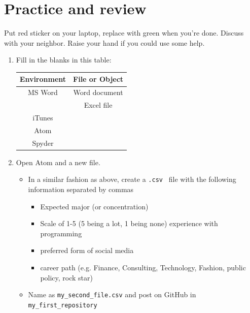 \section*{Practice and review}


Put red sticker on your laptop, replace with green when you're done.
Discuss with your neighbor.
Raise your hand if you could use some help.

\begin{enumerate}

\item Fill in the blanks in this table:

\begin{center}
\begin{tabular}{cc}
\toprule
Environment & File or Object \\
\midrule
MS Word  & Word document  \\
 & Excel file     \\
iTunes & \\
Atom & \\
Spyder   &                \\
\bottomrule
\end{tabular}
\end{center}

\item Open Atom and a new file. 
\begin{itemize}
\item In a similar fashion as above, create a {\tt .csv } file with the following information separated by commas
\begin{itemize}
\item Expected major (or concentration)
\item Scale of 1-5 (5 being a lot, 1 being none) experience with programming
\item preferred form of social media
\item career path (e.g. Finance, Consulting, Technology, Fashion, public policy, rock star)
\end{itemize}
\item Name as \verb|my_second_file.csv| and post on GitHub in \verb|my_first_repository|
\end{itemize}
    


\end{enumerate}
